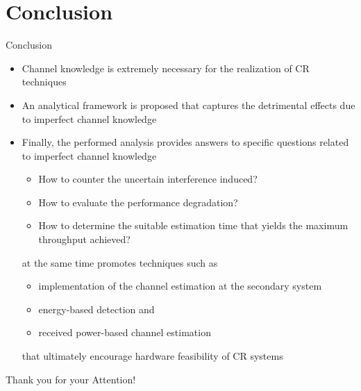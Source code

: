 \documentclass[16pt]{beamer}
\newcommand{\fs}[2]{\fontsize{#1 pt}{#2}\selectfont}
\begin{document}
\fi
\fi

\section{Conclusion}
\begin{frame}[c]{Conclusion}
	\fs{8}{9}
		\begin{itemize}	
			\item Channel knowledge is extremely necessary for the realization of CR techniques %
			\item An analytical framework is proposed that captures the detrimental effects due to imperfect channel knowledge  
			\item Finally, the performed analysis provides answers to specific questions related to imperfect channel knowledge 
				\begin{itemize} 
				\fs{8}{9}
\item How to counter the uncertain interference induced? \item How to evaluate the performance degradation? \item How to determine the suitable estimation time that yields the maximum throughput achieved? \end{itemize}
at the same time promotes techniques such as 

\begin{itemize} 
\fs{8}{9}
\item implementation of the channel estimation at the secondary system \item energy-based detection and \item received power-based channel estimation \end{itemize} that ultimately encourage hardware feasibility of CR systems
		\end{itemize} 
\end{frame}

\begin{frame}[c]{}
\begin{center}
Thank you for your Attention!
\end{center}
\end{frame}
\end{document}
